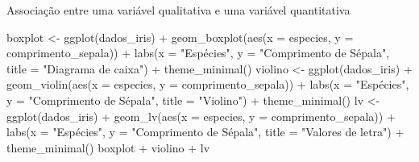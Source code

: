 \documentclass[
  10pt,
  ignorenonframetext,
]{beamer}
\newenvironment{Shaded}{\begin{snugshade}}{\end{snugshade}}
\newcommand{\AttributeTok}[1]{\textcolor[rgb]{0.40,0.45,0.13}{#1}}
\newcommand{\FunctionTok}[1]{\textcolor[rgb]{0.28,0.35,0.67}{#1}}
\newcommand{\NormalTok}[1]{\textcolor[rgb]{0.00,0.23,0.31}{#1}}
\newcommand{\OtherTok}[1]{\textcolor[rgb]{0.00,0.23,0.31}{#1}}
\newcommand{\SpecialCharTok}[1]{\textcolor[rgb]{0.37,0.37,0.37}{#1}}
\newcommand{\StringTok}[1]{\textcolor[rgb]{0.13,0.47,0.30}{#1}}
\begin{document}
\begin{frame}[fragile]{Associação entre uma variável qualitativa e uma
variável quantitativa}
\protect\hypertarget{associauxe7uxe3o-entre-uma-variuxe1vel-qualitativa-e-uma-variuxe1vel-quantitativa}{}
\begin{Shaded}
\begin{Highlighting}[]
\NormalTok{boxplot }\OtherTok{\textless{}{-}} \FunctionTok{ggplot}\NormalTok{(dados\_iris) }\SpecialCharTok{+}
  \FunctionTok{geom\_boxplot}\NormalTok{(}\FunctionTok{aes}\NormalTok{(}\AttributeTok{x =}\NormalTok{ especies, }\AttributeTok{y =}\NormalTok{ comprimento\_sepala)) }\SpecialCharTok{+}
  \FunctionTok{labs}\NormalTok{(}\AttributeTok{x =} \StringTok{"Espécies"}\NormalTok{, }\AttributeTok{y =} \StringTok{"Comprimento de Sépala"}\NormalTok{, }\AttributeTok{title =} \StringTok{"Diagrama de caixa"}\NormalTok{) }\SpecialCharTok{+}
  \FunctionTok{theme\_minimal}\NormalTok{()}
\NormalTok{violino }\OtherTok{\textless{}{-}} \FunctionTok{ggplot}\NormalTok{(dados\_iris) }\SpecialCharTok{+}
  \FunctionTok{geom\_violin}\NormalTok{(}\FunctionTok{aes}\NormalTok{(}\AttributeTok{x =}\NormalTok{ especies, }\AttributeTok{y =}\NormalTok{ comprimento\_sepala)) }\SpecialCharTok{+}
  \FunctionTok{labs}\NormalTok{(}\AttributeTok{x =} \StringTok{"Espécies"}\NormalTok{, }\AttributeTok{y =} \StringTok{"Comprimento de Sépala"}\NormalTok{, }\AttributeTok{title =} \StringTok{"Violino"}\NormalTok{) }\SpecialCharTok{+}
  \FunctionTok{theme\_minimal}\NormalTok{()}
\NormalTok{lv }\OtherTok{\textless{}{-}} \FunctionTok{ggplot}\NormalTok{(dados\_iris) }\SpecialCharTok{+}
  \FunctionTok{geom\_lv}\NormalTok{(}\FunctionTok{aes}\NormalTok{(}\AttributeTok{x =}\NormalTok{ especies, }\AttributeTok{y =}\NormalTok{ comprimento\_sepala)) }\SpecialCharTok{+}
  \FunctionTok{labs}\NormalTok{(}\AttributeTok{x =} \StringTok{"Espécies"}\NormalTok{, }\AttributeTok{y =} \StringTok{"Comprimento de Sépala"}\NormalTok{, }\AttributeTok{title =} \StringTok{"Valores de letra"}\NormalTok{) }\SpecialCharTok{+}
  \FunctionTok{theme\_minimal}\NormalTok{()}
\NormalTok{boxplot }\SpecialCharTok{+}\NormalTok{ violino }\SpecialCharTok{+}\NormalTok{ lv}
\end{Highlighting}
\end{Shaded}
\end{frame}
\end{document}
